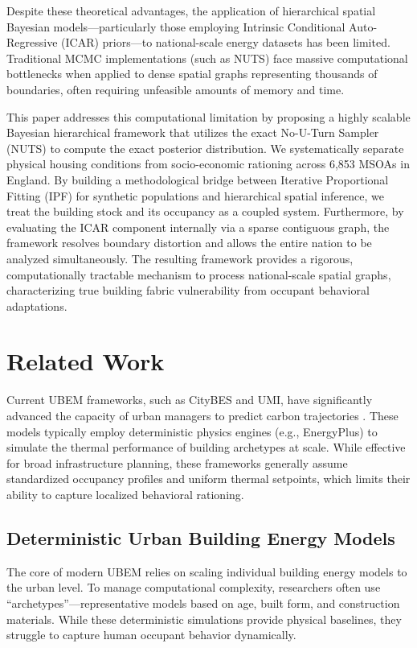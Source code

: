 \documentclass[11pt, a4paper, twocolumn, numbers]{elsarticle}
\begin{document}
Despite these theoretical advantages, the application of hierarchical spatial Bayesian models---particularly those employing Intrinsic Conditional Auto-Regressive (ICAR) priors---to national-scale energy datasets has been limited. Traditional MCMC implementations (such as NUTS) face massive computational bottlenecks when applied to dense spatial graphs representing thousands of boundaries, often requiring unfeasible amounts of memory and time.

This paper addresses this computational limitation by proposing a highly scalable Bayesian hierarchical framework that utilizes the exact No-U-Turn Sampler (NUTS) to compute the exact posterior distribution. We systematically separate physical housing conditions from socio-economic rationing across 6,853 MSOAs in England. By building a methodological bridge between Iterative Proportional Fitting (IPF) for synthetic populations and hierarchical spatial inference, we treat the building stock and its occupancy as a coupled system. Furthermore, by evaluating the ICAR component internally via a sparse contiguous graph, the framework resolves boundary distortion and allows the entire nation to be analyzed simultaneously. The resulting framework provides a rigorous, computationally tractable mechanism to process national-scale spatial graphs, characterizing true building fabric vulnerability from occupant behavioral adaptations.

\section{Related Work}\label{related-work}

Current UBEM frameworks, such as CityBES and UMI, have significantly advanced the capacity of urban managers to predict carbon trajectories \cite{Chen2017, Reinhart2016}. These models typically employ deterministic physics engines (e.g., EnergyPlus) to simulate the thermal performance of building archetypes at scale. While effective for broad infrastructure planning, these frameworks generally assume standardized occupancy profiles and uniform thermal setpoints, which limits their ability to capture localized behavioral rationing.

\subsection{Deterministic Urban Building Energy Models}\label{deterministic-urban-building-energy-models}

The core of modern UBEM relies on scaling individual building energy models to the urban level. To manage computational complexity, researchers often use ``archetypes''---representative models based on age, built form, and construction materials. While these deterministic simulations provide physical baselines, they struggle to capture human occupant behavior dynamically.
\end{document}
